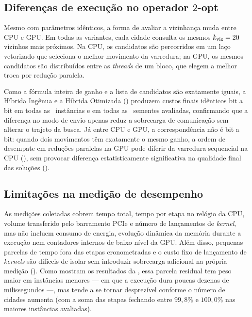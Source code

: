 \subsection{Diferenças de execução no operador \texorpdfstring{\(2\)-opt}{2-opt}}\label{sec-5311-semantica-operadores}

Mesmo com parâmetros idênticos, a forma de avaliar a vizinhança muda entre CPU e GPU.
Em todas as variantes, cada cidade consulta os mesmos \(k_{\text{viz}} = 20\) vizinhos mais próximos.
Na CPU, os candidatos são percorridos em um laço vetorizado que seleciona o melhor movimento da varredura; na GPU, os mesmos candidatos são distribuídos entre as \emph{threads} de um bloco, que elegem a melhor troca por redução paralela.

Como a fórmula inteira de ganho e a lista de candidatos são exatamente iguais, a Híbrida Ingênua e a Híbrida Otimizada () produzem custos finais idênticos bit a bit em todas as \totalinstancias\ instâncias e em todas as \totalrepeticoes\ sementes avaliadas, confirmando que a diferença no modo de envio apenas reduz a sobrecarga de comunicação sem alterar o trajeto da busca.
Já entre CPU e GPU, a correspondência não é bit a bit: quando dois movimentos têm exatamente o mesmo ganho, a ordem de desempate em reduções paralelas na GPU pode diferir da varredura sequencial na CPU (), sem provocar diferença estatisticamente significativa na qualidade final das soluções ().

\subsection{Limitações na medição de desempenho}\label{sec-532-instrumentacao}

As medições coletadas cobrem tempo total, tempo por etapa no relógio da CPU, volume transferido pelo barramento PCIe e número de lançamentos de \emph{kernel}, mas não incluem consumo de energia, evolução dinâmica da memória durante a execução nem contadores internos de baixo nível da GPU.
Além disso, pequenas parcelas de tempo fora das etapas cronometradas e o custo fixo de lançamento de \emph{kernels} são difíceis de isolar sem introduzir sobrecarga adicional na própria medição ().
Como mostram os resultados da , essa parcela residual tem peso maior em instâncias menores --- em que a execução dura poucas dezenas de milissegundos ---, mas tende a se tornar desprezível conforme o número de cidades aumenta (com a soma das etapas fechando entre \(99{,}8\%\) e \(100{,}0\%\) nas maiores instâncias avaliadas).

